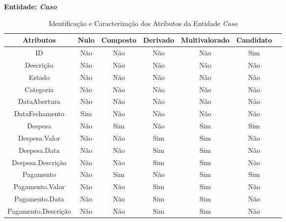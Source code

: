 \documentclass[a4paper,12pt]{scrreprt}
\newcommand{\Nao}{%
    \cellcolor{red!40}Não
}
\newcommand{\Sim}{%
    \cellcolor{green!40}Sim
}
\begin{document}
        \textbf{Entidade: \textit{Caso}}
        \begin{table}[!ht]
        \centering
        \begin{tabular}{|c|c|c|c|c|c|c|}
        \hline
        \rowcolor{gray!20!white}
        \textbf{Atributos} & \textbf{Nulo} & \textbf{Composto} & \textbf{Derivado} & \textbf{Multivalorado} & \textbf{Candidato} \\
        \hline
        ID                  & \Nao & \Nao & \Nao & \Nao & \Sim \\
        Descrição           & \Nao & \Nao & \Nao & \Nao & \Nao \\
        Estado              & \Nao & \Nao & \Nao & \Nao & \Nao \\
        Categoria           & \Nao & \Nao & \Nao & \Nao & \Nao \\
        DataAbertura        & \Nao & \Nao & \Nao & \Nao & \Nao \\
        DataFechamento      & \Sim & \Nao & \Nao & \Nao & \Nao \\
        Despesa             & \Nao & \Sim & \Nao & \Sim & \Sim \\
        Despesa.Valor       & \Nao & \Nao & \Sim & \Sim & \Nao \\
        Despesa.Data        & \Nao & \Nao & \Sim & \Sim & \Nao \\
        Despesa.Descrição   & \Nao & \Nao & \Sim & \Sim & \Nao \\
        Pagamento           & \Nao & \Sim & \Nao & \Sim & \Sim \\
        Pagamento.Valor     & \Nao & \Nao & \Sim & \Sim & \Nao \\
        Pagamento.Data      & \Nao & \Nao & \Sim & \Sim & \Nao \\
        Pagamento.Descrição & \Nao & \Nao & \Sim & \Sim & \Nao \\
        \hline
        \end{tabular}
        \caption{Identificação e Caracterização dos Atributos da Entidade \textit{Caso}}
        \end{table}
\end{document}
